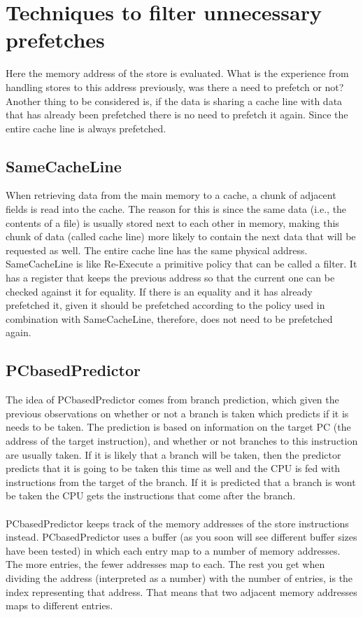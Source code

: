 \section{Techniques to filter unnecessary prefetches}
 Here the memory address of the store is evaluated. What is the experience from handling stores to this address previously, was there a need to prefetch or not? Another
thing to be considered is, if the data is sharing a cache line with data that has already
been prefetched there is no need to prefetch it again. Since the entire cache line is
always prefetched.
 \subsection{SameCacheLine}
When retrieving data from the main memory to a cache, a chunk of adjacent fields is
read into the cache. The reason for this is since the same data (i.e., the contents of a
file) is usually stored next to each other in memory, making this chunk of data (called
cache line) more likely to contain the next data that will be requested as well. The
entire cache line has the same physical address. SameCacheLine is like Re-Execute a
primitive policy that can be called a filter. It has a register that keeps the previous
address so that the current one can be checked against it for equality. If there is an
equality and it has already prefetched it, given it should be prefetched according to
the policy used in combination with SameCacheLine, therefore, does not need to be
prefetched again. 
\subsection{PCbasedPredictor}
The idea of PCbasedPredictor comes from branch prediction, which given the previous observations on whether or not a branch is taken which predicts if it is needs to
be taken. The prediction is based on information on the target PC (the address of
the target instruction), and whether or not branches to this instruction are usually
taken. If it is likely that a branch will be taken, then the predictor predicts that it
is going to be taken this time as well and the CPU is fed with instructions from the
target of the branch. If it is predicted that a branch is wont be taken the CPU gets the instructions that come after the branch. \\ \\
PCbasedPredictor keeps track of the memory addresses of the store instructions instead. PCbasedPredictor uses a buffer (as you soon will see different buffer sizes have been tested) in which each entry map to a number of memory addresses. The more entries, the fewer addresses map to each. The rest you get when dividing the address
(interpreted as a number) with the number of entries, is the index representing that
address. That means that two adjacent memory addresses maps to different entries.\\ \\


